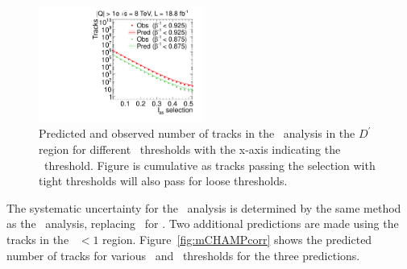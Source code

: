 \begin{figure}
 \begin{center}
  \includegraphics[clip=false, trim=0.0cm 0cm 0.0cm 0cm, width=0.48\textwidth]{figures/multi/Prediction_Data8TeV_NPredVsNObs_Flip}
 \end{center}
 \caption[Predicted and observed number of tracks in the \invbeta\ $<$ 1 region for different sets of thresholds in the \multi\ analysis.]
{Predicted and observed number of tracks in the \multi\ analysis in the $D^{\prime}$ region for different \invbeta\ thresholds with the x-axis indicating the \ias\ threshold.
Figure is cumulative as tracks passing the selection with tight thresholds will also pass for loose thresholds.
}
\label{fig:MultiPred}
\end{figure}

The systematic uncertainty for the \multi\ analysis is determined by the same method as the \muononly\ analysis, replacing \pt\ for \ias. 
Two additional predictions are made using the tracks in the \invbeta\ $< 1$ region.
Figure~\ref{fig:mCHAMPcorr} shows the predicted number of tracks for various \invbeta\ and \dedx\ thresholds for the three predictions.

